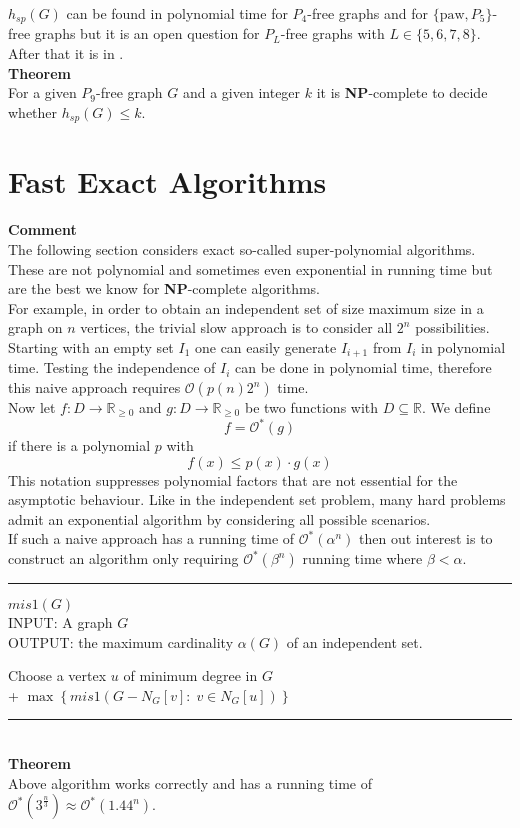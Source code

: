\documentclass[a4paper, 12pt]{article}
\begin{document}
	$h_{sp}(G)$ can be found in polynomial time for $P_4$-free graphs and for $\{\text{paw}, P_5\}$-free graphs but it is an open question for $P_L$-free graphs with $L \in \{5,6,7,8\}$. After that it is in .\\
	\textbf{Theorem}\\
	For a given $P_9$-free graph $G$ and a given integer $k$ it is \textbf{NP}-complete to decide whether $h_{sp}(G) \leq k$.
	\section{Fast Exact Algorithms}
	\textbf{Comment}\\
	The following section considers exact so-called super-polynomial algorithms. These are not polynomial and sometimes even exponential in running time but are the best we know for \textbf{NP}-complete algorithms.\\
	
	For example, in order to obtain an independent set of size maximum size in a graph on $n$ vertices, the trivial slow approach is to consider all $2^n$ possibilities.\\
	Starting with an empty set $I_1$ one can easily generate $I_{i+1}$ from $I_i$ in polynomial time. Testing the independence of $I_i$ can be done in polynomial time, therefore this naive approach requires $\mathcal{O}(p(n)2^n)$ time.\\
	
	Now let $f:D \to \mathbb{R}_{\geq 0}$ and $g: D \to \mathbb{R}_{\geq 0}$ be two functions with $D \subseteq \mathbb{R}$. We define \[f = \mathcal{O}^*(g)\] if there is a polynomial $p$ with \[f(x) \leq p(x) \cdot g(x)\]
	This notation suppresses polynomial factors that are not essential for the asymptotic behaviour. Like in the independent set problem, many hard problems admit an exponential algorithm by considering all possible scenarios.\\
	If such a naive approach has a running time of $\mathcal{O}^*(\alpha^n)$ then out interest is to construct an algorithm only requiring $\mathcal{O}^*(\beta^n)$ running time where $\beta < \alpha$.
	\par\noindent\rule{\textwidth}{0.4pt}
	\underline{$mis1(G)$}\\
	INPUT: A graph $G$\\
	OUTPUT: the maximum cardinality $\alpha(G)$ of an independent set.
	\begin{algorithmic}[1]
		\EndIf
		\State Choose a vertex $u$ of minimum degree in $G$\\
		+ $\max\left\{mis1(G - N_G[v]: \; v \in N_G[u])\right\}$
	\end{algorithmic}
	\par\noindent\rule{\textwidth}{0.4pt}\\
	\textbf{Theorem}\\
	Above algorithm works correctly and has a running time of $\mathcal{O}^*(3^{\frac{n}{3}}) \approx \mathcal{O}^*(1.44^n)$.
\end{document}
